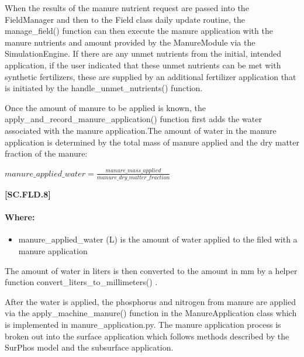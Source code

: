 When the results of the manure nutrient request are passed into the FieldManager and then to the Field class daily update routine, the manage\_field() function can then execute the manure application with the manure nutrients and amount provided by the ManureModule via the SimulationEngine. If there are any unmet nutrients from the initial, intended application, if the user indicated that these unmet nutrients can be met with synthetic fertilizers, these are supplied by an additional fertilizer application that is initiated by the handle\_unmet\_nutrients() function. 
\vspace{0.2cm}

Once the amount of manure to be applied is known, the apply\_and\_record\_manure\_application() function first adds the water associated with the manure application.The amount of water in the manure application is determined by the total mass of manure applied and the dry matter fraction of the manure:
            \vspace{0.5cm} 
    
    \begin{center}
        \(manure\_applied\_water=\frac{manure\_mass\_applied }{ manure\_dry\_matter\_fraction}\)
    \end{center}
        \vspace{0.5cm} 
    
            {\raggedleft \textbf{[SC.FLD.8]}\par}
            \vspace{0.5cm} 
            
\paragraph{Where:}
\begin{itemize}
    \item manure\_applied\_water (L) is the amount of water applied to the filed with a manure application
\end{itemize}

The amount of water in liters is then converted to the amount in mm by a helper function convert\_liters\_to\_millimeters() . 
\vspace{0.2cm}

After the water is applied, the phosphorus and nitrogen from manure are applied via the apply\_machine\_manure() function in the ManureApplication class which is implemented in manure\_application.py. The manure application process is broken out into the surface application which follows methods described by the SurPhos model \parencite{vadas2007}  and the subsurface application. 


